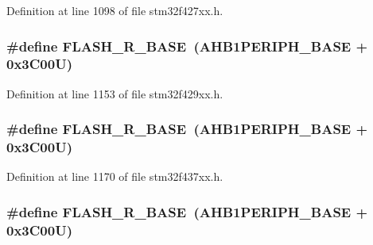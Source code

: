 Definition at line 1098 of file stm32f427xx.\+h.

\subsubsection[{\texorpdfstring{F\+L\+A\+S\+H\+\_\+\+R\+\_\+\+B\+A\+SE}{FLASH_R_BASE}}]{\setlength{\rightskip}{0pt plus 5cm}\#define F\+L\+A\+S\+H\+\_\+\+R\+\_\+\+B\+A\+SE~({\bf A\+H\+B1\+P\+E\+R\+I\+P\+H\+\_\+\+B\+A\+SE} + 0x3\+C00\+U)}\hypertarget{group___peripheral__memory__map_ga8e21f4845015730c5731763169ec0e9b}{}\label{group___peripheral__memory__map_ga8e21f4845015730c5731763169ec0e9b}


Definition at line 1153 of file stm32f429xx.\+h.

\subsubsection[{\texorpdfstring{F\+L\+A\+S\+H\+\_\+\+R\+\_\+\+B\+A\+SE}{FLASH_R_BASE}}]{\setlength{\rightskip}{0pt plus 5cm}\#define F\+L\+A\+S\+H\+\_\+\+R\+\_\+\+B\+A\+SE~({\bf A\+H\+B1\+P\+E\+R\+I\+P\+H\+\_\+\+B\+A\+SE} + 0x3\+C00\+U)}\hypertarget{group___peripheral__memory__map_ga8e21f4845015730c5731763169ec0e9b}{}\label{group___peripheral__memory__map_ga8e21f4845015730c5731763169ec0e9b}


Definition at line 1170 of file stm32f437xx.\+h.

\subsubsection[{\texorpdfstring{F\+L\+A\+S\+H\+\_\+\+R\+\_\+\+B\+A\+SE}{FLASH_R_BASE}}]{\setlength{\rightskip}{0pt plus 5cm}\#define F\+L\+A\+S\+H\+\_\+\+R\+\_\+\+B\+A\+SE~({\bf A\+H\+B1\+P\+E\+R\+I\+P\+H\+\_\+\+B\+A\+SE} + 0x3\+C00\+U)}\hypertarget{group___peripheral__memory__map_ga8e21f4845015730c5731763169ec0e9b}{}\label{group___peripheral__memory__map_ga8e21f4845015730c5731763169ec0e9b}


